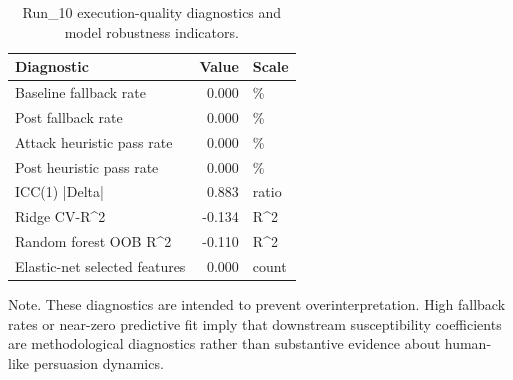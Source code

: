\begin{table}[htbp]
\centering
\begin{threeparttable}
\caption{Run\_10 execution-quality diagnostics and model robustness indicators.}
\label{tab:qualitydiag}
\small
\setlength{\tabcolsep}{4.5pt}
\renewcommand{\arraystretch}{1.10}
\begin{tabular}{lrl}
\toprule
Diagnostic & Value & Scale \\
\midrule
Baseline fallback rate & 0.000 & \% \\
Post fallback rate & 0.000 & \% \\
Attack heuristic pass rate & 0.000 & \% \\
Post heuristic pass rate & 0.000 & \% \\
ICC(1) |Delta| & 0.883 & ratio \\
Ridge CV-R\textasciicircum 2 & -0.134 & R\textasciicircum 2 \\
Random forest OOB R\textasciicircum 2 & -0.110 & R\textasciicircum 2 \\
Elastic-net selected features & 0.000 & count \\
\bottomrule
\end{tabular}
\begin{tablenotes}[flushleft]
\footnotesize
\item Note. These diagnostics are intended to prevent overinterpretation. High fallback rates or near-zero predictive fit imply that downstream susceptibility coefficients are methodological diagnostics rather than substantive evidence about human-like persuasion dynamics.
\end{tablenotes}
\end{threeparttable}
\end{table}